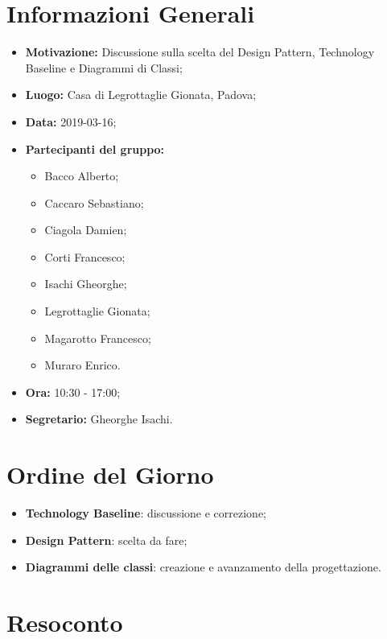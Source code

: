 \documentclass[a4paper, oneside, openany, dvipsnames, table]{article}
\begin{document}
\copertina{}


\newpage
\tableofcontents
\newpage
\section{Informazioni Generali}
\begin{itemize}
\item \textbf{Motivazione:} Discussione sulla scelta del Design Pattern, Technology Baseline e Diagrammi di Classi;
\item \textbf{Luogo:} Casa di Legrottaglie Gionata, Padova;
\item \textbf{Data:} 2019-03-16;
\item \textbf{Partecipanti del gruppo:} \hfill
	\begin{itemize}
	\item Bacco Alberto;
	\item Caccaro Sebastiano;
	\item Ciagola Damien;
	\item Corti Francesco;
	\item Isachi Gheorghe;
	\item Legrottaglie Gionata;
	\item Magarotto Francesco;
	\item Muraro Enrico.
	\end{itemize} 
\item \textbf{Ora:} 10:30 - 17:00;
\item \textbf{Segretario:} Gheorghe Isachi.
\end{itemize}

\section{Ordine del Giorno}
\begin{itemize}
\item \textbf{Technology Baseline}: discussione e correzione;
\item \textbf{Design Pattern}: scelta da fare; 
\item \textbf{Diagrammi delle classi}: creazione e avanzamento della progettazione.
\end{itemize}

\section{Resoconto}
\end{document}
